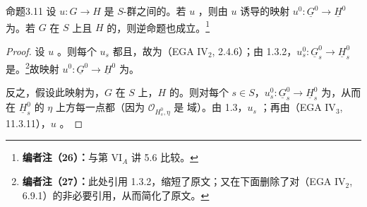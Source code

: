 \begin{SGAresult}{命题}{3.11}
设 $u:G\to H$ 是 $S$-群之间的。若 $u$ ，则由 $u$ 诱导的映射 $u^0:\underline G^0\to\underline H^0$ 为。若 $G$ 在 $S$ 上且 $H$ 的，则逆命题也成立。\footnote{\textbf{编者注（26）：}与第 VI$_A$ 讲 5.6 比较。}
\end{SGAresult}
\begin{proof}
设 $u$ 。则每个 $u_s$ 都且，故为（EGA IV$_2$, 2.4.6）；由 1.3.2，$u_s^0:\underline G_s^0\to\underline H_s^0$ 是。\footnote{\textbf{编者注（27）：}此处引用 1.3.2，缩短了原文；又在下面删除了对（EGA IV$_2$, 6.9.1）的非必要引用，从而简化了原文。}故映射 $u^0:\underline G^0\to\underline H^0$ 为。

反之，假设此映射为，$G$ 在 $S$ 上，$H$ 的。则对每个 $s\in S$，$u_s^0:\underline G_s^0\to\underline H_s^0$ 为，从而在 $\underline H_s^0$ 的 $\eta$ 上方每一点都（因为 $\mathcal O_{H_s^0,\eta}$ 是
域）。由 1.3，$u_s$ ；再由（EGA IV$_3$, 11.3.11），$u$ 。
\end{proof}

